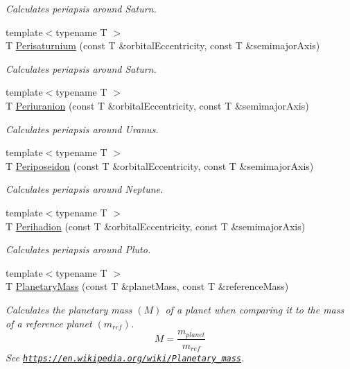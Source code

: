 \begin{DoxyCompactItemize}
\begin{DoxyCompactList}\small\item\em Calculates periapsis around Saturn. \end{DoxyCompactList}\item 
{\footnotesize template$<$typename T $>$ }\\T \mbox{\hyperlink{group___e_g_x_phys-_periapsis_ga60a50d09d29ebe47cbbfc125c2ea42bf}{Perisaturnium}} (const T \&orbital\+Eccentricity, const T \&semimajor\+Axis)
\begin{DoxyCompactList}\small\item\em Calculates periapsis around Saturn. \end{DoxyCompactList}\item 
{\footnotesize template$<$typename T $>$ }\\T \mbox{\hyperlink{group___e_g_x_phys-_periapsis_gab8b8131a617dd2d2a4de1d48accd7442}{Periuranion}} (const T \&orbital\+Eccentricity, const T \&semimajor\+Axis)
\begin{DoxyCompactList}\small\item\em Calculates periapsis around Uranus. \end{DoxyCompactList}\item 
{\footnotesize template$<$typename T $>$ }\\T \mbox{\hyperlink{group___e_g_x_phys-_periapsis_ga237e7af3794202c67e65f64f4c8abc2a}{Periposeidon}} (const T \&orbital\+Eccentricity, const T \&semimajor\+Axis)
\begin{DoxyCompactList}\small\item\em Calculates periapsis around Neptune. \end{DoxyCompactList}\item 
{\footnotesize template$<$typename T $>$ }\\T \mbox{\hyperlink{group___e_g_x_phys-_periapsis_gafb16e46e55078b38604eef0d7c7c40c4}{Perihadion}} (const T \&orbital\+Eccentricity, const T \&semimajor\+Axis)
\begin{DoxyCompactList}\small\item\em Calculates periapsis around Pluto. \end{DoxyCompactList}\item 
{\footnotesize template$<$typename T $>$ }\\T \mbox{\hyperlink{group___e_g_x_phys-_planetary_mass_ga225bcf56fb37468f6d4d46493d403503}{Planetary\+Mass}} (const T \&planet\+Mass, const T \&reference\+Mass)
\begin{DoxyCompactList}\small\item\em Calculates the planetary mass $(M)$ of a planet when comparing it to the mass of a reference planet $(m_{ref})$. \[M=\frac{m_{planet}}{m_{ref}}\] See \href{https://en.wikipedia.org/wiki/Planetary_mass}{\tt https\+://en.\+wikipedia.\+org/wiki/\+Planetary\+\_\+mass}. \end{DoxyCompactList}\item 

\end{DoxyCompactItemize}
